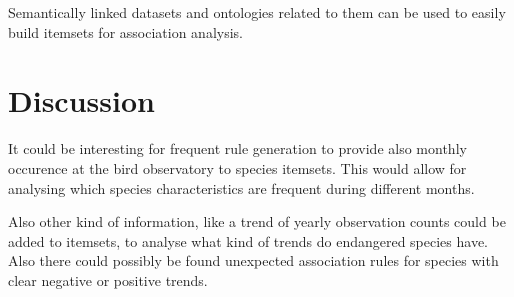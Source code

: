 \documentclass[english]{tktltiki2}
\begin{document}
Semantically linked datasets and ontologies related to them can be used to easily build itemsets for association analysis.

\section{Discussion}

It could be interesting for frequent rule generation to provide also monthly occurence at the bird observatory to species itemsets. This would allow for analysing which species characteristics are frequent during different months.

Also other kind of information, like a trend of yearly observation counts could be added to itemsets, to analyse what kind of trends do endangered species have. Also there could possibly be found unexpected association rules for species with clear negative or positive trends.


\pagebreak

%
%
% 
%




\lastpage
\end{document}
